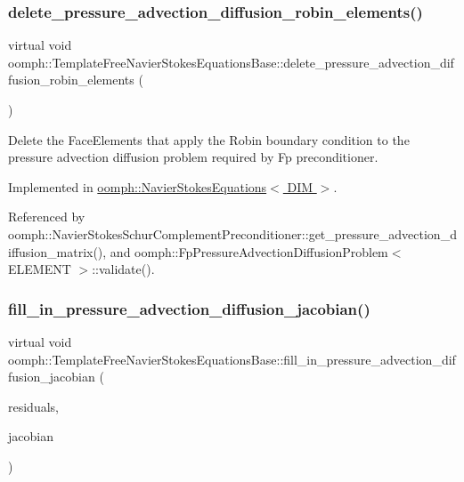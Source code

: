 \subsubsection{\texorpdfstring{delete\+\_\+pressure\+\_\+advection\+\_\+diffusion\+\_\+robin\+\_\+elements()}{delete\_pressure\_advection\_diffusion\_robin\_elements()}}
{\footnotesize\ttfamily virtual void oomph\+::\+Template\+Free\+Navier\+Stokes\+Equations\+Base\+::delete\+\_\+pressure\+\_\+advection\+\_\+diffusion\+\_\+robin\+\_\+elements (\begin{DoxyParamCaption}{ }\end{DoxyParamCaption})\hspace{0.3cm}{\ttfamily [pure virtual]}}



Delete the Face\+Elements that apply the Robin boundary condition to the pressure advection diffusion problem required by Fp preconditioner. 



Implemented in \hyperlink{classoomph_1_1NavierStokesEquations_aae9c4d4a523e3f0c9280df798ec606a9}{oomph\+::\+Navier\+Stokes\+Equations$<$ D\+I\+M $>$}.



Referenced by oomph\+::\+Navier\+Stokes\+Schur\+Complement\+Preconditioner\+::get\+\_\+pressure\+\_\+advection\+\_\+diffusion\+\_\+matrix(), and oomph\+::\+Fp\+Pressure\+Advection\+Diffusion\+Problem$<$ E\+L\+E\+M\+E\+N\+T $>$\+::validate().

\mbox{\label{classoomph_1_1TemplateFreeNavierStokesEquationsBase_a5ce6cf1b23a079c7b8658b13f5b62c08}} 
\subsubsection{\texorpdfstring{fill\+\_\+in\+\_\+pressure\+\_\+advection\+\_\+diffusion\+\_\+jacobian()}{fill\_in\_pressure\_advection\_diffusion\_jacobian()}}
{\footnotesize\ttfamily virtual void oomph\+::\+Template\+Free\+Navier\+Stokes\+Equations\+Base\+::fill\+\_\+in\+\_\+pressure\+\_\+advection\+\_\+diffusion\+\_\+jacobian (\begin{DoxyParamCaption}\item[{\hyperlink{classoomph_1_1Vector}{Vector}$<$ double $>$ \&}]{residuals,  }\item[{\hyperlink{classoomph_1_1DenseMatrix}{Dense\+Matrix}$<$ double $>$ \&}]{jacobian }\end{DoxyParamCaption})\hspace{0.3cm}{\ttfamily [pure virtual]}}



